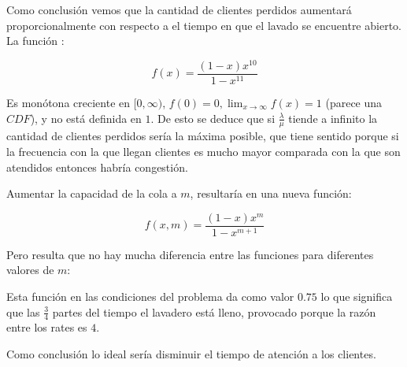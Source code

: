 \documentclass[14pt]{extarticle}
\begin{document}
    \begin{figure}[htbp]
  \centering
  

\end{figure}

Como conclusión vemos que la cantidad de clientes perdidos aumentará proporcionalmente con respecto a el tiempo en que el lavado se encuentre abierto. La función :

$$f(x) = \frac{(1-x)x^{10}}{1-x^{11}}$$

Es monótona creciente en $[0, \infty)$, $f(0) = 0, \lim_{x \to \infty} f(x) = 1$ (parece una $CDF$), y no está definida en $1$. De esto se deduce que si $\frac{\lambda}{\mu}$ tiende a infinito la cantidad de clientes perdidos sería la máxima posible, que tiene sentido porque si la frecuencia con la que llegan clientes es mucho mayor comparada con la que son atendidos entonces habría congestión.

Aumentar la capacidad de la cola a $m$, resultaría en una nueva función:

$$f(x, m) = \frac{(1-x)x^{m}}{1-x^{m+1}}$$

Pero resulta que no hay mucha diferencia entre las funciones para diferentes valores de $m$:

\begin{figure}[htbp]
    \centering
    
  \end{figure}

Esta función en las condiciones del problema da como valor $0.75$ lo que significa que las $\frac{3}{4}$ partes del tiempo el lavadero está lleno, provocado porque la razón entre los rates es $4$.

Como conclusión lo ideal sería disminuir el tiempo de atención a los clientes.
\end{document}
